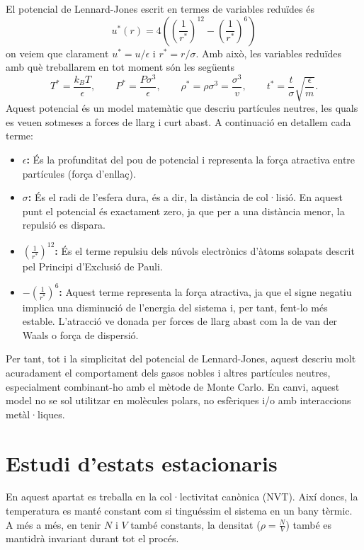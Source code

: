 \documentclass[a4paper,10.5pt]{report}
\begin{document}
El potencial de Lennard-Jones escrit en termes de variables reduïdes és
\begin{equation}
	u^*(r)=4\left(\left(\frac{1}{r^*}\right)^{12}-\left(\frac{1}{r^*}\right)^6\right) \label{eq:2.2}
\end{equation}
on veiem que clarament $u^*=u/\epsilon$ i $r^*=r/\sigma$. Amb això, les variables reduïdes amb què treballarem en tot moment són les següents
\begin{equation*}
	T^*=\frac{k_BT}{\epsilon}, \qquad P^*=\frac{P\sigma^3}{\epsilon}, \qquad \rho^*=\rho\sigma^3=\frac{\sigma^3}{v}, \qquad t^*=\frac{t}{\sigma}\sqrt{\frac{\epsilon}{m}}.
\end{equation*}
Aquest potencial és un model matemàtic que descriu partícules neutres, les quals es veuen sotmeses a forces de llarg i curt abast. A continuació en detallem cada terme:
\begin{itemize}
	\item \textbf{$\epsilon$:} És la profunditat del pou de potencial i representa la força atractiva entre partícules (força d'enllaç).
	\item \textbf{$\sigma$:} És el radi de l'esfera dura, és a dir, la distància de col·lisió. En aquest punt el potencial és exactament zero, ja que per a una distància menor, la repulsió es dispara.
	\item \textbf{$\left(\frac{1}{r^*}\right)^{12}$:} És el terme repulsiu dels núvols electrònics d'àtoms solapats descrit pel Principi d'Exclusió de Pauli.
	\item \textbf{$-\left(\frac{1}{r^*}\right)^6$:} Aquest terme representa la força atractiva, ja que el signe negatiu implica una disminució de l'energia del sistema i, per tant, fent-lo més estable. L'atracció ve donada per forces de llarg abast com la de van der Waals o força de dispersió.
\end{itemize}

Per tant, tot i la simplicitat del potencial de Lennard-Jones, aquest descriu molt acuradament el comportament dels gasos nobles i altres partícules neutres, especialment combinant-ho amb el mètode de Monte Carlo. En canvi, aquest model no se sol utilitzar en molècules polars, no esfèriques i/o amb interaccions metàl·liques.

\section{Estudi d'estats estacionaris}
En aquest apartat es treballa en la col·lectivitat canònica (NVT). Així doncs, la temperatura es manté constant com si tinguéssim el sistema en un bany tèrmic. A més a més, en tenir $N$ i $V$ també constants, la densitat ($\rho=\frac{N}{V}$) també es mantidrà invariant durant tot el procés.
\end{document}
